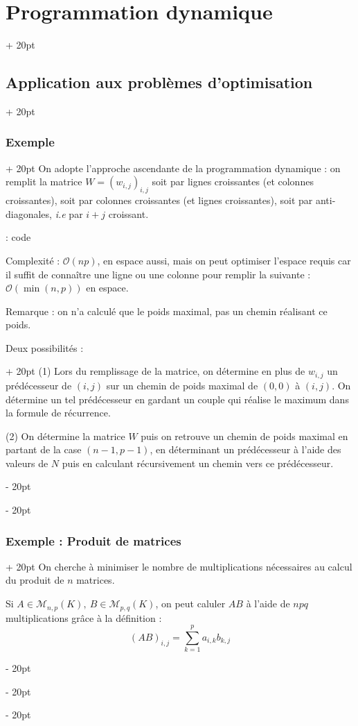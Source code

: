 \documentclass[a4paper, 12pt, twoside]{article}
\newcommand{\ind}[1][20pt]{\advance\leftskip + #1}
\newcommand{\deind}[1][20pt]{\advance\leftskip - #1}
\newenvironment{indt}[2][20pt]{#2 \par \ind[#1]}{\par \deind} %
\begin{document}
\begin{indt}{\section{Programmation dynamique}}
\begin{indt}{\subsection{Application aux problèmes d'optimisation}}
\begin{indt}{\subsubsection{Exemple}}
                On adopte l'approche ascendante de la programmation dynamique : on remplit la matrice $W = (w_{i, j})_{i, j}$ soit par lignes croissantes (et colonnes croissantes), soit par colonnes croissantes (et lignes croissantes), soit par anti-diagonales, \textit{i.e} par $i + j$ croissant.
                
                 : code
                
                \vspace{12pt}
                
                Complexité : $\mathcal O(np)$, en espace aussi, mais on peut optimiser l'espace requis car il suffit de connaître une ligne ou une colonne pour remplir la suivante : $\mathcal O(\min(n, p))$ en espace.
                
                \vspace{12pt}
                
                Remarque : on n'a calculé que le poids maximal, pas un chemin réalisant ce poids.
                
                \begin{indt}{Deux possibilités :}
                    (1) Lors du remplissage de la matrice, on détermine en plus de $w_{i, j}$ un prédécesseur de $(i, j)$ sur un chemin de poids maximal de $(0, 0)$ à $(i ,j)$. On détermine un tel prédécesseur en gardant un couple qui réalise le maximum dans la formule de récurrence.
                    
                    (2) On détermine la matrice $W$ puis on retrouve un chemin de poids maximal en partant de la case $(n - 1, p - 1)$, en déterminant un prédécesseur à l'aide des valeurs de $N$ puis en calculant récursivement un chemin vers ce prédécesseur.
                \end{indt}
            \end{indt}
            
            \vspace{12pt}
            
            \begin{indt}{\subsubsection{Exemple : Produit de matrices}}
                On cherche à minimiser le nombre de multiplications nécessaires au calcul du produit de $n$ matrices.
                
                Si $A \in \mathcal M_{n, p}(K),\ B \in \mathcal M_{p, q} (K)$, on peut caluler $AB$ à l'aide de $npq$ multiplications grâce à la définition :
                    \[ (AB)_{i, j} = \sum_{k = 1}^p a_{i,k} b_{k, j} \]
                

\end{indt}
\end{indt}
\end{indt}
\end{document}
